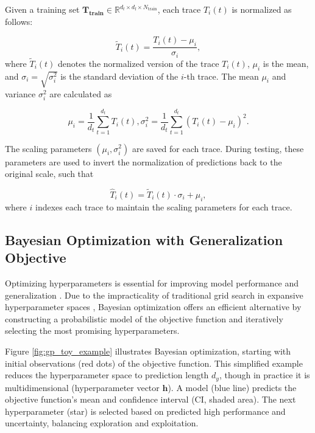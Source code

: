 \documentclass{ieeetmlcn}
\begin{document}
Given a training set $\mathbf{T_{\text{train}}} \in \mathbb{R}^{d_t \times d_{\text{f}} \times N_{\text{train}}}$, each trace $T_i(t)$ is normalized as follows:

\begin{equation}
\tilde{T}_i(t) = \frac{T_i(t) - \mu_i}{\sigma_i},  
\end{equation}
where $\tilde{T}_i(t)$ denotes the normalized version of the trace $T_i(t)$, \(\mu_i\) is the mean, and \(\sigma_i = \sqrt{\sigma_i^2}\) is the standard deviation of the \(i\)-th trace. The mean \(\mu_i\) and variance \(\sigma_i^2\) are calculated as

\begin{equation}
\mu_i = \frac{1}{d_t} \sum_{t=1}^{d_t} T_i(t),   \sigma_i^2 = \frac{1}{d_t} \sum_{t=1}^{d_t} (T_i(t) - \mu_i)^2.
\end{equation}

The scaling parameters $(\mu_i, \sigma_i^2)$ are saved for each trace. During testing, these parameters are used to invert the normalization of predictions back to the original scale, such that

\begin{equation}
\hat{T}_i(t) = \tilde{T}_i(t) \cdot \sigma_i + \mu_i,
\end{equation}
where $i$ indexes each trace to maintain the scaling parameters for each trace.

\subsection{Bayesian Optimization with Generalization Objective}
\label{sec:BayesianOptimizationWithGeneralizationObjective}

Optimizing hyperparameters is essential for improving model performance and generalization \cite{hyperparamsdatasets}. Due to the impracticality of traditional grid search in expansive hyperparameter spaces \cite{gridsearchvsbayesian}, Bayesian optimization \cite{frazier2018tutorial} offers an efficient alternative by constructing a probabilistic model of the objective function and iteratively selecting the most promising hyperparameters.

Figure \ref{fig:gp_toy_example} illustrates Bayesian optimization, starting with initial observations (red dots) of the objective function. This simplified example reduces the hyperparameter space to prediction length $d_y$, though in practice it is multidimensional (hyperparameter vector $\mathbf{h}$). A model (blue line) predicts the objective function's mean and confidence interval (CI, shaded area). The next hyperparameter (star) is selected based on predicted high performance and uncertainty, balancing exploration and exploitation.
\end{document}
